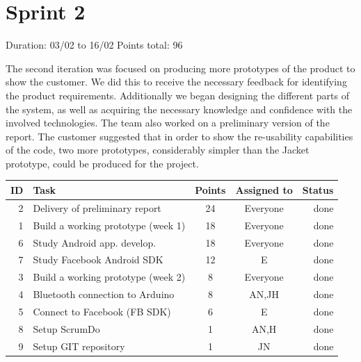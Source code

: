 \newpage

\section{Sprint 2}

Duration: 03/02 to 16/02\newline
Points total: 96

The second iteration was focused on producing more prototypes of the product to
show the customer. We did this to receive the necessary feedback for identifying
the product requirements. Additionally we began designing the different parts of the
system, as well as acquiring the necessary knowledge and confidence with the
involved technologies. The team also worked on a preliminary version of the
report. The customer suggested that in order to show the re-usability
capabilities of the code, two more prototypes, considerably simpler than the
Jacket prototype, could be produced for the project.

\begin{table}[ht!]
\begin{tabular}{ | r | l | c | c | r | }

\hline
\textbf{ID} & \textbf{Task} & \textbf{Points} & \textbf{Assigned to} &\textbf{Status} \\
\hline

 2 & Delivery of preliminary report				& 24 & Everyone		& done \\
\hline
 1 & Build a working prototype (week 1)			& 18 & Everyone		& done \\
\hline
 6 & Study Android app. develop.				& 18 & Everyone		& done \\
\hline
 7 & Study Facebook Android SDK					& 12 & E			& done \\
\hline
 3 & Build a working prototype (week 2)			& 8  & Everyone		& done \\
\hline
 4 & Bluetooth connection to Arduino			& 8  & AN,JH		& done \\
\hline
 5 & Connect to Facebook (FB SDK)				& 6  & E			& done \\
\hline
 8 & Setup ScrumDo								& 1  & AN,H			& done \\
\hline
 9 & Setup GIT repository						& 1  & JN			& done \\
\hline

\end{tabular}
\end{table}


